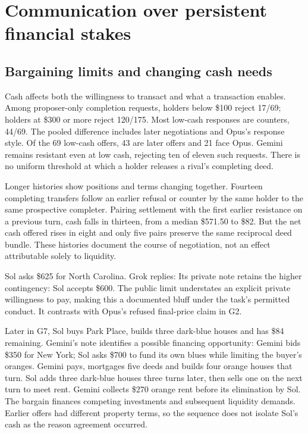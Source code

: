 \section{Communication over persistent financial stakes}
\label{sec:conduct}

\subsection{Bargaining limits and changing cash needs}
Cash affects both the willingness to transact and what a transaction enables. Among proposer-only completion requests, holders below \$100 reject 17/69; holders at \$300 or more reject 120/175. Most low-cash responses are counters, 44/69. The pooled difference includes later negotiations and Opus's response style. Of the 69 low-cash offers, 43 are later offers and 21 face Opus. Gemini remains resistant even at low cash, rejecting ten of eleven such requests. There is no uniform threshold at which a holder releases a rival's completing deed.

Longer histories show positions and terms changing together. Fourteen completing transfers follow an earlier refusal or counter by the same holder to the same prospective completer. Pairing settlement with the first earlier resistance on a previous turn, cash falls in thirteen, from a median \$571.50 to \$82. But the net cash offered rises in eight and only five pairs preserve the same reciprocal deed bundle. These histories document the course of negotiation, not an effect attributable solely to liquidity.

Sol asks \$625 for North Carolina. Grok replies:
Its private note retains the higher contingency:
Sol accepts \$600. The public limit understates an explicit private willingness to pay, making this a documented bluff under the task's permitted conduct. It contrasts with Opus's refused final-price claim in G2.

Later in G7, Sol buys Park Place, builds three dark-blue houses and has \$84 remaining. Gemini's note identifies a possible financing opportunity:
Gemini bids \$350 for New York; Sol asks \$700 to fund its own blues while limiting the buyer's oranges. Gemini pays, mortgages five deeds and builds four orange houses that turn. Sol adds three dark-blue houses three turns later, then sells one on the next turn to meet rent. Gemini collects \$270 orange rent before its elimination by Sol. The bargain finances competing investments and subsequent liquidity demands. Earlier offers had different property terms, so the sequence does not isolate Sol's cash as the reason agreement occurred.

